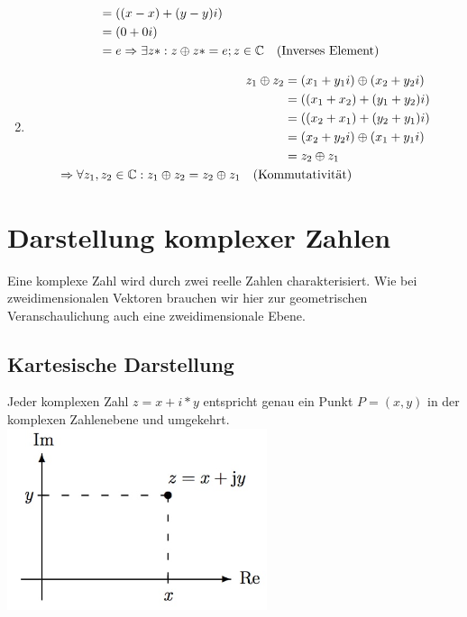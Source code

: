 \begin{Beweis}
\begin{enumerate}[1)]
\begin{align*}
																		  														 	   &= ((x - x) + (y - y)i) \\
	  															  													 				   &= (0 + 0i) \\
																																	   &= e
	  					\Rightarrow \exists z*: z \oplus z* = e; z \in \mathbb{C} \quad \text{(Inverses Element)}&
	  				  \end{align*}
			\item \begin{align*}
						z_1 \oplus z_2 &= (x_1 + y_1i) \oplus (x_2 + y_2i) \\
									   &= ((x_1 + x_2) + (y_1 + y_2)i) \\
									   &= ((x_2 + x_1) + (y_2 + y_1)i) \\
									   &= (x_2 + y_2i) \oplus (x_1 + y_1i) \\
									   &= z_2 \oplus z_1 \\
						\Rightarrow \forall z_1, z_2 \in \mathbb{C}: z_1 \oplus z_2 = z_2 \oplus z_1 \quad \text{(Kom}&\text{mutativität)}
				  \end{align*}
		\end{enumerate}
	\end{Beweis}

\section{Darstellung komplexer Zahlen}

	Eine komplexe Zahl wird durch zwei reelle Zahlen charakterisiert. Wie bei zweidimensionalen Vektoren brauchen wir hier zur geometrischen Veranschaulichung auch eine zweidimensionale Ebene.\\

	\subsection{Kartesische Darstellung}

		Jeder komplexen Zahl $z =x+i*y$ entspricht genau ein Punkt $P =(x,y)$ in der komplexen Zahlenebene und umgekehrt.\\

		\includegraphics[width=3in]{kap6/komplexezahlen1}

